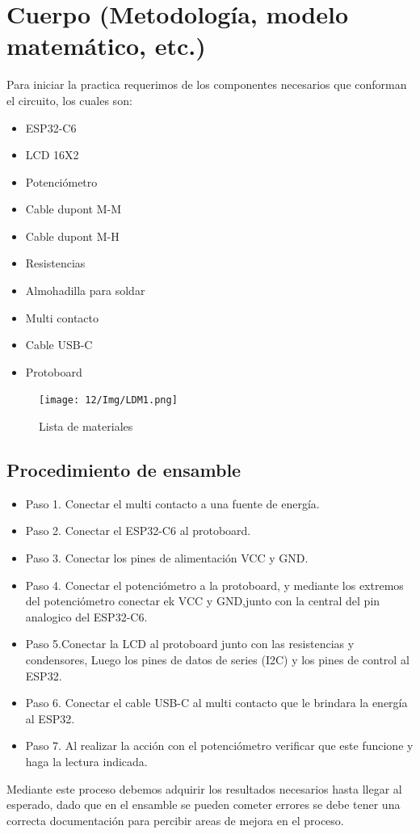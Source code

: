     \section{Cuerpo (Metodología, modelo matemático, etc.)}
    Para iniciar la practica requerimos de los componentes necesarios que conforman el circuito, los cuales son:
    \begin{itemize}
        \item ESP32-C6
        \item LCD 16X2
        \item Potenciómetro
        \item Cable dupont M-M
        \item Cable dupont M-H
        \item Resistencias
        \item Almohadilla para soldar
        \item Multi contacto
        \item Cable USB-C
        \item Protoboard 
    \end{itemize}
    \begin{figure}[H]
        \centering
        \texttt{[image: 12/Img/LDM1.png]}
        \caption{Lista de materiales}
        \label{fig:LDM1.png}
    \end{figure}
    
    \subsection{Procedimiento de ensamble}
    \begin{itemize}
        \item Paso 1. Conectar el multi contacto a una fuente de energía.
        \item Paso 2. Conectar el ESP32-C6 al protoboard.
        \item Paso 3. Conectar los pines de alimentación VCC y GND.
        \item Paso 4. Conectar el potenciómetro a la protoboard, y mediante los extremos del potenciómetro conectar ek VCC y GND,junto con la central del pin analogico del ESP32-C6.
        \item Paso 5.Conectar la LCD al protoboard junto con las resistencias y condensores, Luego los pines de datos de series (I2C) y los pines de control al ESP32.
        \item Paso 6. Conectar el cable USB-C al multi contacto que le brindara la energía al ESP32.
        \item Paso 7. Al realizar la acción con el potenciómetro verificar que este funcione y haga la lectura indicada. 
    \end{itemize}
    Mediante este proceso debemos adquirir los resultados necesarios hasta llegar al esperado, dado que en el ensamble se pueden cometer errores se debe tener una correcta documentación para percibir areas de mejora en el proceso.
        
